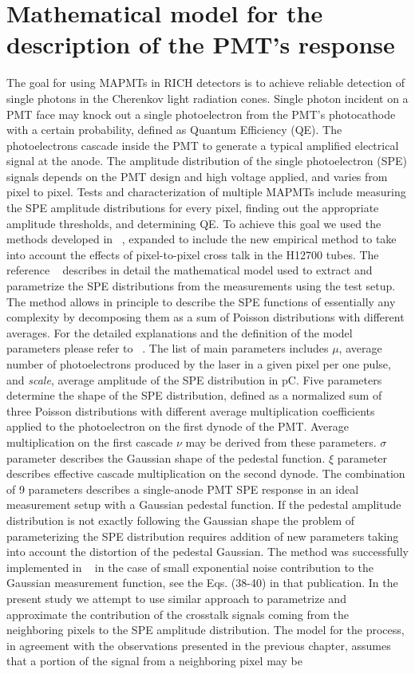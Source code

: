 \section{Mathematical model for the description of the PMT's response}

The goal for using MAPMTs in RICH detectors is to achieve reliable detection of single photons in the Cherenkov light radiation cones. Single photon incident on a PMT face may knock out a single photoelectron from the PMT's photocathode with a certain probability, defined as Quantum Efficiency (QE). The photoelectrons cascade inside the PMT to generate a typical amplified electrical signal at the anode. The amplitude distribution of the single photoelectron (SPE) signals depends on the PMT design and high voltage applied, and varies from pixel to pixel. Tests and characterization of multiple MAPMTs include measuring the SPE amplitude distributions for every pixel, finding out the appropriate amplitude thresholds, and determining QE. To achieve this goal we used the methods developed in ~\cite{DEGTIARENKO20171}, expanded to include the new empirical method to take into account the effects of pixel-to-pixel cross talk in the H12700 tubes. The reference ~\cite{DEGTIARENKO20171} describes in detail the mathematical model used to extract and parametrize the SPE distributions from the measurements using the test setup. The method allows in principle to describe the SPE functions of essentially any complexity by decomposing them as a sum of Poisson distributions with different averages. For the detailed explanations and the definition of the model parameters please refer to ~\cite{DEGTIARENKO20171}. The list of main parameters includes $\mu$, average number of photoelectrons produced by the laser in a given pixel per one pulse, and {\it{scale}}, average amplitude of the SPE distribution in pC. Five parameters determine the shape of the SPE distribution, defined as a normalized sum of three Poisson distributions with different average multiplication coefficients applied to the photoelectron on the first dynode of the PMT. Average multiplication on the first cascade ${\nu}$ may be derived from these parameters. ${\sigma}$ parameter describes the Gaussian shape of the pedestal function. ${\xi}$ parameter describes effective cascade multiplication on the second dynode. The combination of 9 parameters describes a single-anode PMT SPE response in an ideal measurement setup with a Gaussian pedestal function. If the pedestal amplitude distribution is not exactly following the Gaussian shape the problem of parameterizing the SPE distribution requires addition of new parameters taking into account the distortion of the pedestal Gaussian. The method was successfully implemented in ~\cite{DEGTIARENKO20171} in the case of small exponential noise contribution to the Gaussian measurement function, see the Eqs. (38-40) in that publication. In the present study we attempt to use similar approach to parametrize and approximate the contribution of the crosstalk signals coming from the neighboring pixels to the SPE amplitude distribution. The model for the process, in agreement with the observations presented in the previous chapter, assumes that a portion of the signal from a neighboring pixel may be 